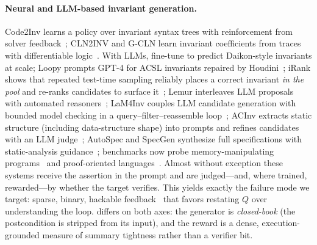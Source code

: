 \paragraph{Neural and LLM-based invariant generation.}
Code2Inv learns a policy over invariant syntax trees with reinforcement from solver feedback~\citep{si2018learning,si2020code2inv}; CLN2INV and G-CLN learn invariant coefficients from traces with differentiable logic~\citep{ryan2020cln2inv,yao2020gcln}.
With LLMs, \citet{pei2023can} fine-tune to predict Daikon-style invariants at scale; Loopy prompts GPT-4 for ACSL invariants repaired by Houdini~\citep{kamath2023finding}; iRank shows that repeated test-time sampling reliably places a correct invariant \emph{in the pool} and re-ranks candidates to surface it~\citep{chakraborty2023ranking}; Lemur interleaves LLM proposals with automated reasoners~\citep{wu2024lemur}; LaM4Inv couples LLM candidate generation with bounded model checking in a query--filter--reassemble loop~\citep{wu2024lam4inv}; ACInv extracts static structure (including data-structure shape) into prompts and refines candidates with an LLM judge~\citep{liu2024acinv}; AutoSpec and SpecGen synthesize full specifications with static-analysis guidance~\citep{wen2024enchanting,ma2024specgen}; benchmarks now probe memory-manipulating programs~\citep{liu2024towards} and proof-oriented languages~\citep{chakraborty2024towards,first2023baldur,misu2024towards}.
Almost without exception these systems receive the assertion in the prompt and are judged---and, where trained, rewarded---by whether the target verifies.
This yields exactly the failure mode we target: sparse, binary, hackable feedback~\citep{skalse2022defining,gao2023scaling} that favors restating $Q$ over understanding the loop.
\sam{} differs on both axes: the generator is \emph{closed-book} (the postcondition is stripped from its input), and the reward is a dense, execution-grounded measure of summary tightness rather than a verifier bit.

